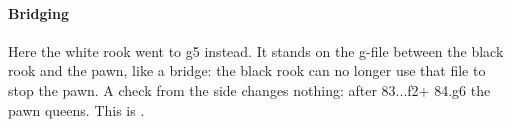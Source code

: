 \paragraph{Bridging}


Here the white rook went to g5 instead. It stands on the g-file between the black rook and the
pawn, like a bridge: the black rook can no longer use that file to stop the pawn. A check from the
side changes nothing: after 83...\R f2+ 84.\K g6 the pawn queens. This is
.
